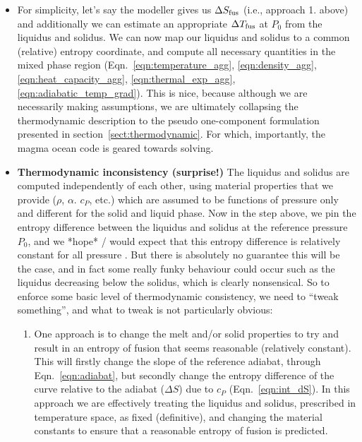 \begin{itemize}
\begin{enumerate}
\end{enumerate}
\item For simplicity, let's say the modeller gives us $\Delta S_{\rm fus}$ (i.e., approach 1. above) and additionally we can estimate an appropriate $\Delta T_{\rm fus}$ at $P_0$ from the liquidus and solidus.  We can now map our liquidus and solidus to a common (relative) entropy coordinate, and compute all necessary quantities in the mixed phase region (Eqn.~\ref{eqn:temperature_agg}, \ref{eqn:density_agg}, \ref{eqn:heat_capacity_agg}, \ref{eqn:thermal_exp_agg}, \ref{eqn:adiabatic_temp_grad}).  This is nice, because although we are necessarily making assumptions, we are ultimately collapsing the thermodynamic description to the pseudo one-component formulation presented in section~\ref{sect:thermodynamic}.  For which, importantly, the magma ocean code is geared towards solving.
\item \textbf{Thermodynamic inconsistency (surprise!)}
  The liquidus and solidus are computed independently of each other, using material properties that we provide ($\rho$, $\alpha$. $c_P$, etc.) which are assumed to be functions of pressure only and different for the solid and liquid phase.  Now in the step above, we pin the entropy difference between the liquidus and solidus at the reference pressure $P_0$, and we *hope* / would expect that this entropy difference is relatively constant for all pressure  .  But there is absolutely no guarantee this will be the case, and in fact some really funky behaviour could occur such as the liquidus decreasing below the solidus, which is clearly nonsensical.  So to enforce some basic level of thermodynamic consistency, we need to ``tweak something'', and what to tweak is not particularly obvious:
\begin{enumerate}
\item One approach is to change the melt and/or solid properties to try and result in an entropy of fusion that seems reasonable (relatively constant).  This will firstly change the slope of the reference adiabat, through Eqn.~\ref{eqn:adiabat}, but secondly change the entropy difference of the curve relative to the adiabat ($\Delta S$) due to $c_P$ (Eqn.~\ref{eqn:int_dS}).  In this approach we are effectively treating the liquidus and solidus, prescribed in temperature space, as fixed (definitive), and changing the material constants to ensure that a reasonable entropy of fusion is predicted.

\end{enumerate}
\end{itemize}
